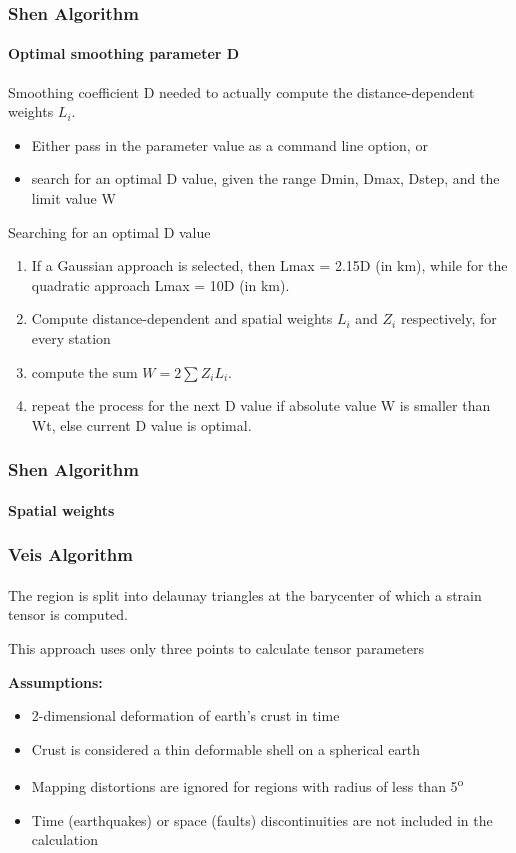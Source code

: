 \begin{frame}
  \frametitle{Shen Algorithm}
  \framesubtitle{Optimal smoothing parameter D}
  \label{ch2:}
 
  Smoothing coefficient D needed to actually compute the distance-dependent weights  $L_{i}$.
 
  \begin{itemize}
    \item Either pass in the parameter value as a command line option, or
    \item search for an optimal D value, given the range Dmin, Dmax, Dstep, and the limit value W
  \end{itemize}
  
  Searching for an optimal D value
  
  \begin{enumerate}
    \item If a Gaussian approach is selected, then Lmax = 2.15D (in km), while for the quadratic approach Lmax = 10D (in km).
    \item Compute distance-dependent and spatial weights $ L_{i} $ and $ Z_{i} $ respectively, for every station
    \item compute the sum $ W = 2\sum Z_{i} L_{i} $.
    \item repeat the process for the next D value if absolute value W is smaller than Wt, else current D value is optimal.
  \end{enumerate}
 
 

\end{frame}
\note{}

\begin{frame}
  \frametitle{Shen Algorithm}
  \framesubtitle{Spatial weights}
  \label{ch2:}
  
\end{frame}
\note{}

\begin{frame}
  \frametitle{Veis Algorithm}
  \framesubtitle{}
  \label{ch2:}
  
  The region is split into delaunay triangles at the barycenter of which a strain tensor is computed.
  
  This approach uses only three points to calculate tensor parameters
  
  \textbf{Assumptions:}
  \begin{itemize}
    \item 2-dimensional deformation of earth's crust in time
    \item Crust is considered a thin deformable shell on a spherical earth
    \item Mapping distortions are ignored for regions with radius of less than 5\textsuperscript{o}
    \item Time (earthquakes) or space (faults) discontinuities are not included in the calculation
  \end{itemize}
\end{frame}
\note{}

